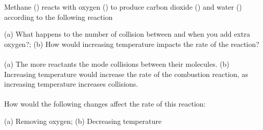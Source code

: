 \documentclass[main.tex]{subfiles}
\newcommand\chapterlabel{kinetics}
\begin{document}
\begin{description}
\begin{minipage}[t]{1.7\linewidth}
\end{minipage}
\vspace{6cm}
\begin{example} %
Methane () reacts with oxygen () to produce carbon dioxide () and water () according to the following reaction
\begin{center}\end{center}
(a) What happens to the number of collision between  and  when you add extra oxygen?; (b) How would increasing temperature impacts the rate of the reaction?\\
\\
(a) The more reactants the mode collisions between their molecules. (b) Increasing temperature would increase the rate of the combustion reaction, as increasing temperature increases collisions. 
\\
\faDiamond\ \\
How would the following changes affect the rate of this reaction:
\begin{center}\end{center}
 (a) Removing oxygen; (b) Decreasing temperature
\\
\end{example}%
\item[\docfilehook{Transition state and activation energy}{}] 

\end{description}
\end{document}
